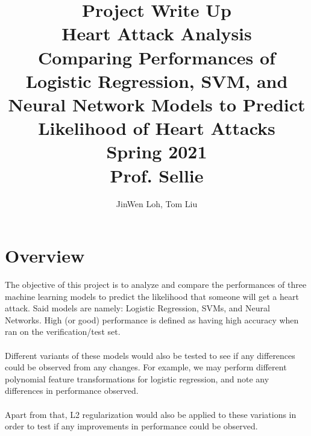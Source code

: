 \documentclass[11pt, oneside]{article}
\title{Project Write Up\\
		\large Heart Attack Analysis\\
		\small Comparing Performances of Logistic Regression, SVM, and Neural Network Models to Predict Likelihood of Heart Attacks\\
		\large Spring 2021\\
		Prof. Sellie}
\author{JinWen Loh, Tom Liu}
\begin{document}
\maketitle
\section *{Overview}
The objective of this project is to analyze and compare the performances of three machine learning models to predict the likelihood that someone will get a heart attack. Said models are namely: Logistic Regression, SVMs, and Neural Networks. High (or good) performance is defined as having high accuracy when ran on the verification/test set.\\\\
Different variants of these models would also be tested to see if any differences could be observed from any changes. For example, we may perform different polynomial feature transformations for logistic regression, and note any differences in performance observed.\\\\
Apart from that, L2 regularization would also be applied to these variations in order to test if any improvements in performance could be observed.\\\\
\end{document}
